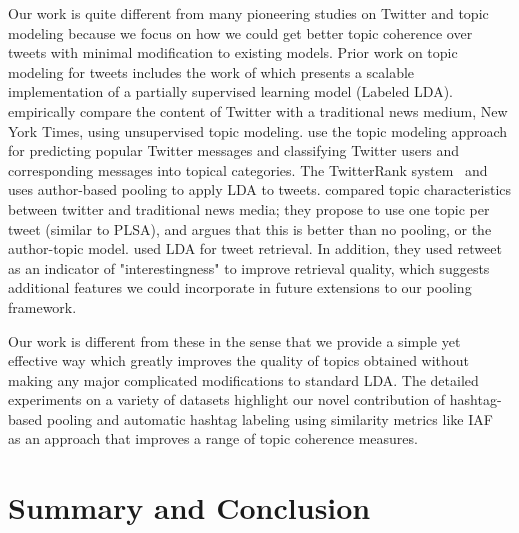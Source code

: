 \documentclass{sig-alternate}
\begin{document}
Our work is quite different from many pioneering studies on Twitter
and topic modeling because we focus on how we could get better
topic coherence over tweets with minimal modification to existing
models. Prior work on topic modeling for tweets includes the work of
\cite{ramage} which presents a scalable implementation of a partially
supervised learning model (Labeled LDA). %
 \cite{wayne} empirically compare the content of Twitter
with a traditional news medium, New York Times, using unsupervised
topic modeling. \cite{hong} use the topic modeling approach for
predicting popular Twitter messages and classifying Twitter users and
corresponding messages into topical categories. %
The {T}witterRank system~\cite{Weng2010wsdm} and \cite{hong} uses author-based pooling to apply LDA to tweets. \cite{wayne} compared
topic characteristics between twitter and traditional news media; they propose to use one topic per tweet (similar to
PLSA), and argues that this is better than no
pooling, or the author-topic model. %
 \cite{Naveed2011cikm} used LDA for tweet retrieval. In
addition, they used retweet as an indicator of "interestingness" to
improve retrieval quality, which suggests additional features we
could incorporate in future extensions to our pooling framework.

Our work is different from these in the sense that we provide a simple
yet effective way which greatly improves the quality of topics
obtained without making any major complicated modifications to
standard LDA. The detailed experiments on a variety of datasets
highlight our novel contribution of hashtag-based pooling and automatic
hashtag labeling using similarity metrics like IAF~\cite{iaf} as an
approach that improves a range of topic coherence measures.

\section{Summary and Conclusion}

\label{sec:conclusion}
\end{document}
